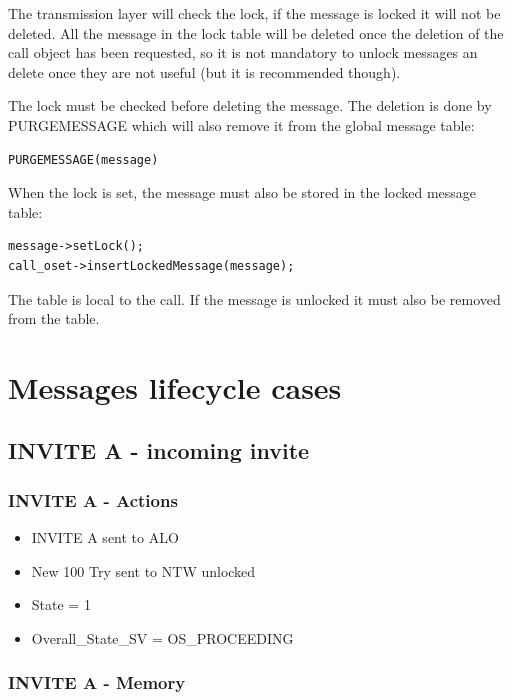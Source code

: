 \documentclass[a4paper]{article}
\begin{document}
The transmission layer will check the lock, if the message is locked it will not be deleted. 
All the message in the lock table will be deleted once the deletion of the call object has been requested, so it is not mandatory to unlock messages an delete once they are not useful
(but it is recommended though).

The lock must be checked before deleting the message. The deletion is done by PURGEMESSAGE which will also remove it from the global message table:
\begin{verbatim}
PURGEMESSAGE(message)
\end{verbatim}

When the lock is set, the message must also be stored in the locked message table:
\begin{verbatim}
message->setLock();
call_oset->insertLockedMessage(message);
\end{verbatim}
The table is local to the call. If the message is unlocked it must also be removed from the table.

\section{Messages lifecycle cases}

\subsection{INVITE A - incoming invite}

\subsubsection{INVITE A - Actions}
\begin {itemize}
\item INVITE A sent to ALO
\item New 100 Try sent to NTW unlocked
\item State = 1
\item Overall\_State\_SV = OS\_PROCEEDING
\end{itemize}

\subsubsection{INVITE A - Memory}
\end{document}
